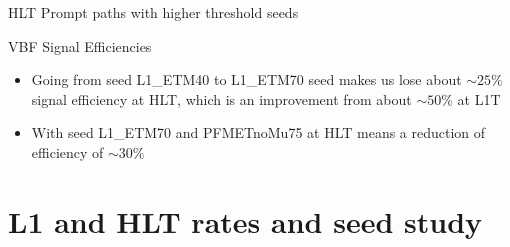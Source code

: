 \documentclass[8pt]{beamer}
\begin{document}
\begin{frame}{HLT Prompt paths with higher threshold seeds}
\begin{block}{VBF Signal Efficiencies}
\end{block}

\begin{itemize}
  \item Going from seed L1\_ETM40 to L1\_ETM70 seed makes us lose about $\sim25\%$ signal efficiency at HLT, which is an improvement from about $\sim50\%$ at L1T 
  \item With seed L1\_ETM70 and PFMETnoMu75 at HLT means a reduction of efficiency of $\sim30\%$
\end{itemize}

\end{frame}

\section{L1 and HLT rates and seed study}
\end{document}
